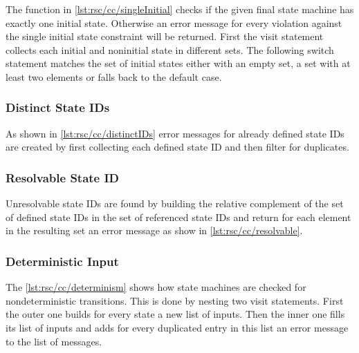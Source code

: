 The function in \autoref{lst:rsc/cc/singleInitial} checks if the given final state machine has exactly one initial state.
Otherwise an error message for every violation against the single initial state constraint will be returned.
First the visit statement collects each initial and noninitial state in different sets.
The following switch statement matches the set of initial states either with an empty set, a set with at least two elements or falls back to the default case.



\subsubsection{Distinct State IDs}

As shown in \autoref{lst:rsc/cc/distinctIDs} error messages for already defined state IDs are created by first collecting each defined state ID and then filter for duplicates.



\subsubsection{Resolvable State ID}

Unresolvable state IDs are found by building the relative complement of the set of defined state IDs in the set of referenced state IDs and return for each element in the resulting set an error message as show in \autoref{lst:rsc/cc/resolvable}.




\subsubsection{Deterministic Input}

The \autoref{lst:rsc/cc/determinism} shows how state machines are checked for nondeterministic transitions.
This is done by nesting two visit statements.
First the outer one builds for every state a new list of inputs.
Then the inner one fills its list of inputs and adds for every duplicated entry in this list an error message to the list of messages.

